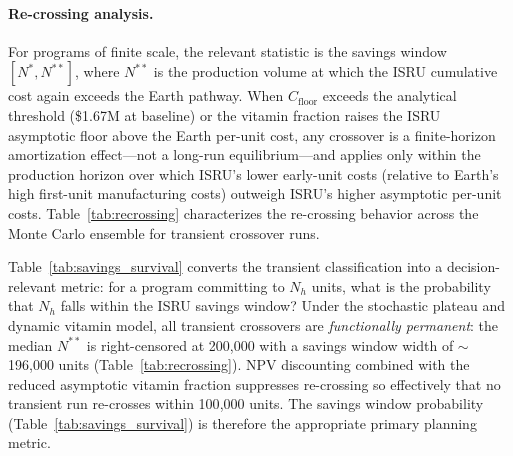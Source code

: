\documentclass[5p,twocolumn]{elsarticle}
\begin{document}
\paragraph{Re-crossing analysis.} For programs of finite scale, the relevant statistic is the savings window $[N^*, N^{**}]$, where $N^{**}$ is the production volume at which the ISRU cumulative cost again exceeds the Earth pathway. When $C_{\mathrm{floor}}$ exceeds the analytical threshold (\$1.67M at baseline) or the vitamin fraction raises the ISRU asymptotic floor above the Earth per-unit cost, any crossover is a finite-horizon amortization effect---not a long-run equilibrium---and applies only within the production horizon over which ISRU's lower early-unit costs (relative to Earth's high first-unit manufacturing costs) outweigh ISRU's higher asymptotic per-unit costs. Table~\ref{tab:recrossing} characterizes the re-crossing behavior across the Monte Carlo ensemble for transient crossover runs.

\begin{table}[htbp]
\centering
\caption{Re-crossing statistics for transient crossover runs ($r = 5\%$, 10{,}000~MC runs). $N^{**}$ is the production volume at which the Earth pathway becomes cheaper again in cumulative NPV terms.}
\label{tab:recrossing}
\small
{}
\end{table}

Table~\ref{tab:savings_survival} converts the transient classification into a decision-relevant metric: for a program committing to $N_h$ units, what is the probability that $N_h$ falls within the ISRU savings window? Under the stochastic plateau and dynamic vitamin model, all transient crossovers are \emph{functionally permanent}: the median $N^{**}$ is right-censored at 200{,}000 with a savings window width of ${\sim}$196{,}000 units (Table~\ref{tab:recrossing}). NPV discounting combined with the reduced asymptotic vitamin fraction suppresses re-crossing so effectively that no transient run re-crosses within 100{,}000 units. The savings window probability (Table~\ref{tab:savings_survival}) is therefore the appropriate primary planning metric.
\end{document}
